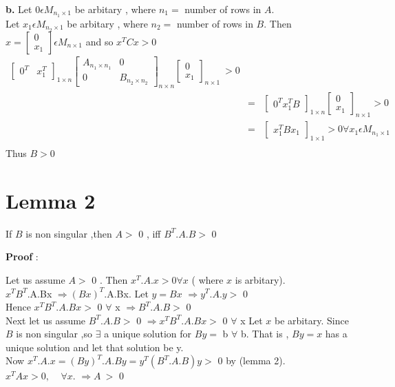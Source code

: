        
{\bf b.} Let $0 \epsilon  M_{n_{1}\times 1}$  be arbitary , where $n_{1}=$ number of rows in $A$.
\\Let  $x_{1} \epsilon   M_{n_{2}\times 1 }$ be arbitary , where $n_{2}=$ number of rows in $B$.
Then  
$x= \begin{bmatrix} 0 \\ x_{1} \end{bmatrix}\epsilon M_{n\times 1}$ and so  $x^{T}Cx > 0$
\begin{eqnarray*}
\begin{bmatrix}0^{T} & x^{T}_{1}\end{bmatrix}_{1\times n}
\begin{bmatrix}A_{n_{1}\times n_{1}} & 0\\ 0 & B_{n_{2}\times n_{2}}\end{bmatrix}_{n\times n}
\begin{bmatrix}0\\x_{1}\end{bmatrix}_{n\times1} \ >  0 \\
& = & 
\begin{bmatrix}0^{T}x_{1}^{T} B\end{bmatrix}_{1\times n}
\begin{bmatrix}0\\x_{1}\end{bmatrix}_{n\times1}> 0\\
& = & 
\begin{bmatrix}x^{T}_{1} B x_{1} \end{bmatrix}_{1\times 1} 
> 0   
\forall x_{1} \epsilon M_{n_{1}\times 1}\\
\end{eqnarray*}
Thus $B > $0

\section{Lemma 2}
If $B$ is non singular ,then $A > $ 0 ,  iff $ B^{T}.A.B > $ 0 

{\bf Proof} :

Let us assume $ A > $ 0 .
Then $ x^{T}.A.x > 0 \forall x $ ( where $x$ is arbitary).
\\$x^{T}B^{T}$.A.Bx
$\Rightarrow (Bx)^{T}$.A.Bx.
 Let $ y  =  Bx $
$\Rightarrow   y^{T}.A.y  > $ 0
 \\Hence $ x^{T}B^{T}.A.Bx  > $ 0   $\forall $ x
$\Rightarrow  B^{T}.A.B   > $ 0 
 \\Next let us assume $ B^{T}.A.B  > $ 0
$\Rightarrow  x^{T}B^{T}.A.Bx  > $ 0   $\forall $ x 
Let $x$ be arbitary.
Since $B$ is non singular ,so $\exists$  a unique solution for  $B y =$ b  $\forall $ b.
That is , $B y= x$ has a unique solution and let that solution be y.
\\Now $x^{T}.A.x = (By)^{T}.A.By = y^{T}(B^{T}.A.B)y >$ 0 by (lemma 2).
$x^{T}Ax >  0,~~~~~ \forall  x $.
$\Rightarrow A \ > $ 0 

